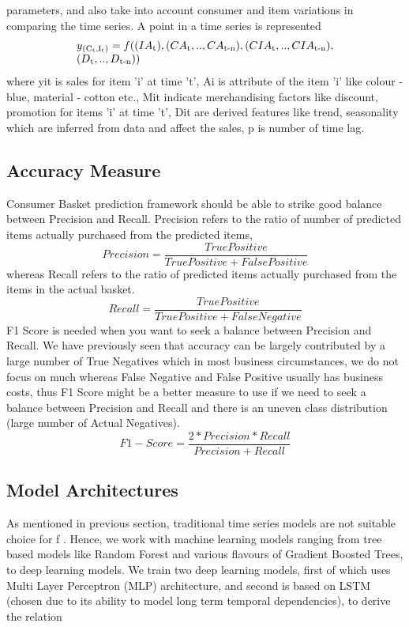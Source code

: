 parameters, and also take into account consumer and item variations in comparing the time series.
A point in a time series is represented
  \begin{equation}
    \begin{array}{l}
      y\textsubscript{(C\textsubscript{t},I\textsubscript{t})}  = f((IA\textsubscript{t}),(CA\textsubscript{t},.., CA\textsubscript{t-n}),
      (CIA\textsubscript{t},.., CIA\textsubscript{t-n}), \\
      (D\textsubscript{t},.., D\textsubscript{t-n}))
    \end{array}
  \end{equation}
where yit is sales for item ’i’ at time ’t’, Ai is attribute of the item ’i’ like colour - blue, material - cotton etc., 
Mit indicate merchandising factors like discount, promotion for items ’i’ at time ’t’, Dit are derived features like 
trend, seasonality which are inferred from data and affect the sales, p is number of time lag.


\subsection{Accuracy Measure}
Consumer Basket prediction framework should be able to strike good balance between Precision and Recall. 
Precision refers to the ratio of number of predicted items actually purchased from the predicted items, 
\[Precision = \frac{True Positive} {True Positive + False Positive}\]
whereas Recall refers to the ratio of predicted items actually purchased from the items in the actual basket. 
\[Recall = \frac{True Positive} {True Positive + False Negative}\]
F1 Score is needed when you want to seek a balance between Precision and Recall.
We have previously seen that accuracy can be largely contributed by a large number of True Negatives which 
in most business circumstances, we do not focus on much whereas False Negative and False Positive usually has 
business costs, thus F1 Score might be a better measure to use if we need to seek a balance
between Precision and Recall and there is an uneven class distribution (large number of Actual Negatives).
\[F1-Score = \frac{2 * Precision * Recall} {Precision + Recall}\]

\subsection{Model Architectures}
As mentioned in previous section, traditional time series models are not suitable choice for f . Hence, we work with machine learning models ranging from tree based models like Random Forest
and various flavours of Gradient Boosted Trees, to deep learning
models. We train two deep learning models, first of which uses
Multi Layer Perceptron (MLP) architecture, and second is based
on LSTM (chosen due to its ability to model long term temporal
dependencies), to derive the relation

